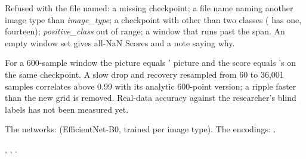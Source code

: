 Refused with the file named: a missing checkpoint; a file name naming another image type than
\emph{image\_type}; a checkpoint with other than two classes ( has one,
 fourteen); \emph{positive\_class} out of range; a window that
runs past the span. An empty window set gives all-NaN Scores and a note saying why.

For a 600-sample window the picture equals ' picture and the
score equals 's on the same checkpoint. A slow drop and recovery
resampled from 60 to 36,001 samples correlates above 0.99 with its analytic 600-point version;
a ripple faster than the new grid is removed. Real-data accuracy against the researcher's blind
labels has not been measured yet.

The networks:  (EfficientNet-B0, trained per image
type). The encodings: .

, ,
.

